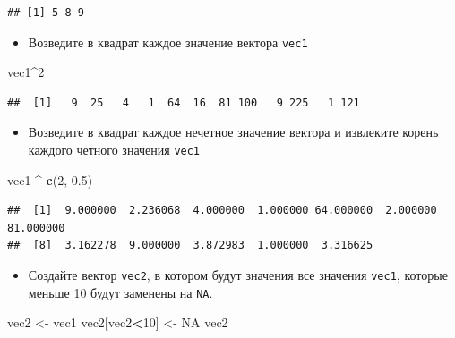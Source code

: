 \documentclass[]{book}
\newenvironment{Shaded}{\begin{snugshade}}{\end{snugshade}}
\newcommand{\DecValTok}[1]{\textcolor[rgb]{0.00,0.00,0.81}{#1}}
\newcommand{\FloatTok}[1]{\textcolor[rgb]{0.00,0.00,0.81}{#1}}
\newcommand{\KeywordTok}[1]{\textcolor[rgb]{0.13,0.29,0.53}{\textbf{#1}}}
\newcommand{\NormalTok}[1]{#1}
\newcommand{\OperatorTok}[1]{\textcolor[rgb]{0.81,0.36,0.00}{\textbf{#1}}}
\newcommand{\OtherTok}[1]{\textcolor[rgb]{0.56,0.35,0.01}{#1}}
\newcommand{\StringTok}[1]{\textcolor[rgb]{0.31,0.60,0.02}{#1}}
\providecommand{\tightlist}{%
  \setlength{\itemsep}{0pt}\setlength{\parskip}{0pt}}
\begin{document}
\begin{verbatim}
## [1] 5 8 9
\end{verbatim}

\begin{itemize}
\tightlist
\item
  Возведите в квадрат каждое значение вектора \texttt{vec1}
\end{itemize}

\begin{Shaded}
\begin{Highlighting}[]
\NormalTok{vec1}\OperatorTok{^}\DecValTok{2}
\end{Highlighting}
\end{Shaded}

\begin{verbatim}
##  [1]   9  25   4   1  64  16  81 100   9 225   1 121
\end{verbatim}

\begin{itemize}
\tightlist
\item
  Возведите в квадрат каждое нечетное значение вектора и извлеките корень каждого четного значения \texttt{vec1}
\end{itemize}

\begin{Shaded}
\begin{Highlighting}[]
\NormalTok{vec1 }\OperatorTok{^}\StringTok{ }\KeywordTok{c}\NormalTok{(}\DecValTok{2}\NormalTok{, }\FloatTok{0.5}\NormalTok{)}
\end{Highlighting}
\end{Shaded}

\begin{verbatim}
##  [1]  9.000000  2.236068  4.000000  1.000000 64.000000  2.000000 81.000000
##  [8]  3.162278  9.000000  3.872983  1.000000  3.316625
\end{verbatim}

\begin{itemize}
\tightlist
\item
  Создайте вектор \texttt{vec2}, в котором будут значения все значения \texttt{vec1}, которые меньше 10 будут заменены на \texttt{NA}.
\end{itemize}

\begin{Shaded}
\begin{Highlighting}[]
\NormalTok{vec2 <-}\StringTok{ }\NormalTok{vec1}
\NormalTok{vec2[vec2}\OperatorTok{<}\DecValTok{10}\NormalTok{] <-}\StringTok{ }\OtherTok{NA}
\NormalTok{vec2}
\end{Highlighting}
\end{Shaded}
\end{document}
